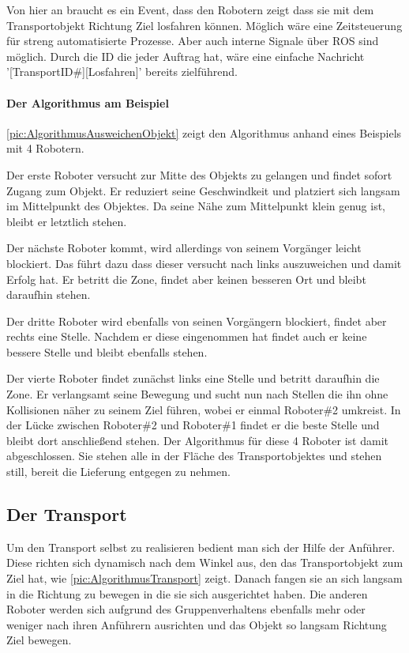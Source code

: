 Von hier an braucht es ein Event, dass den Robotern zeigt dass sie mit dem Transportobjekt Richtung Ziel losfahren können. Möglich wäre eine Zeitsteuerung für streng automatisierte Prozesse. Aber auch interne Signale über ROS sind möglich. Durch die ID die jeder Auftrag hat, wäre eine einfache Nachricht '[TransportID\#][Losfahren]' bereits zielführend.

\paragraph*{Der Algorithmus am Beispiel}
\autoref{pic:AlgorithmusAusweichenObjekt} zeigt den Algorithmus anhand eines Beispiels mit 4 Robotern.

Der erste Roboter versucht zur Mitte des Objekts zu gelangen und findet sofort Zugang zum Objekt. Er reduziert seine Geschwindkeit und platziert sich langsam im Mittelpunkt des Objektes. Da seine Nähe zum Mittelpunkt klein genug ist, bleibt er letztlich stehen.

Der nächste Roboter kommt, wird allerdings von seinem Vorgänger leicht blockiert. Das führt dazu dass dieser versucht nach links auszuweichen und damit Erfolg hat. Er betritt die Zone, findet aber keinen besseren Ort und bleibt daraufhin stehen.

Der dritte Roboter wird ebenfalls von seinen Vorgängern blockiert, findet aber rechts eine Stelle. Nachdem er diese eingenommen hat findet auch er keine bessere Stelle und bleibt ebenfalls stehen.

Der vierte Roboter findet zunächst links eine Stelle und betritt daraufhin die Zone. Er verlangsamt seine Bewegung und sucht nun nach Stellen die ihn ohne Kollisionen näher zu seinem Ziel führen, wobei er einmal Roboter\#2 umkreist. In der Lücke zwischen Roboter\#2 und Roboter\#1 findet er die beste Stelle und bleibt dort anschließend stehen. Der Algorithmus für diese 4 Roboter ist damit abgeschlossen. Sie stehen alle in der Fläche des Transportobjektes und stehen still, bereit die Lieferung entgegen zu nehmen.

\subsection*{Der Transport}

Um den Transport selbst zu realisieren bedient man sich der Hilfe der Anführer. Diese richten sich dynamisch nach dem Winkel aus, den das Transportobjekt zum Ziel hat, wie \autoref{pic:AlgorithmusTransport} zeigt. Danach fangen sie an sich langsam in die Richtung zu bewegen in die sie sich ausgerichtet haben. Die anderen Roboter werden sich aufgrund des Gruppenverhaltens ebenfalls mehr oder weniger nach ihren Anführern ausrichten und das Objekt so langsam Richtung Ziel bewegen.

